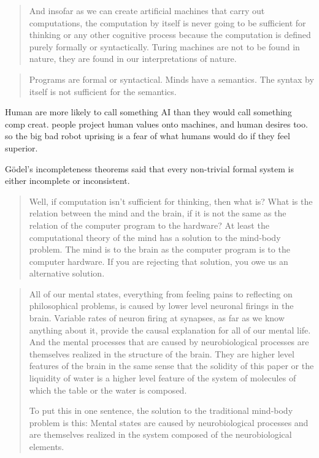 \documentclass[11pt]{thesis} %
\begin{document}
\begin{quotation}
  And insofar as we can create artificial machines that carry out computations, the computation by itself is never going to be sufficient for thinking or any other cognitive process because the computation is defined purely formally or syntactically. Turing machines are not to be found in nature, they are found in our interpretations of nature.
\end{quotation}

\begin{quotation}
  Programs are formal or syntactical. Minds have a semantics. The syntax by itself is not sufficient for the semantics.
\end{quotation}

Human are more likely to call something AI than they would call something comp creat.
people project human values onto machines, and human desires too. so the big bad robot uprising is a fear of what humans would do if they feel superior.

Gödel's incompleteness theorems said that every non-trivial formal system is either incomplete or inconsistent.

\begin{quotation}
  Well, if computation isn’t sufficient for thinking, then what is? What is the relation between the mind and the brain, if it is not the same as the relation of the computer program to the hardware? At least the computational theory of the mind has a solution to the mind-body problem. The mind is to the brain as the computer program is to the computer hardware. If you are rejecting that solution, you owe us an alternative solution.
\end{quotation}

\begin{quotation}
  All of our mental states, everything from feeling pains to reflecting on philosophical problems, is caused by lower level neuronal firings in the brain. Variable rates of neuron firing at synapses, as far as we know anything about it, provide the causal explanation for all of our mental life. And the mental processes that are caused by neurobiological processes are themselves realized in the structure of the brain. They are higher level features of the brain in the same sense that the solidity of this paper or the liquidity of water is a higher level feature of the system of molecules of which the table or the water is composed.

  To put this in one sentence, the solution to the traditional mind-body problem is this: Mental states are caused by neurobiological processes and are themselves realized in the system composed of the neurobiological elements.
\end{quotation}
\end{document}
